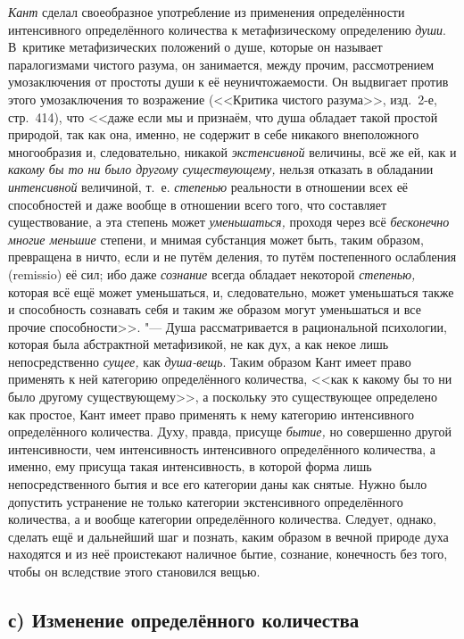 {\em Кант} сделал своеобразное употребление из применения определённости
интенсивного определённого количества к метафизическому определению {\em души}.
В~критике метафизических положений о душе, которые он называет паралогизмами
чистого разума, он занимается, между прочим, рассмотрением умозаключения от
простоты души к её неуничтожаемости. Он выдвигает против этого умозаключения то
возражение (<<Критика чистого разума>>, изд.~2-е, стр.~414), что <<даже если мы
и признаём, что душа обладает такой простой природой, так как она, именно, не
содержит в себе никакого внеположного многообразия и, следовательно, никакой
{\em экстенсивной} величины, всё же ей, как и {\em какому бы то ни было другому
существующему,} нельзя отказать в обладании {\em интенсивной} величиной, т.~е.
{\em степенью} реальности в отношении всех её способностей и даже вообще
в отношении всего того, что составляет существование, а эта степень может
{\em уменьшаться,} проходя через всё {\em бесконечно многие меньшие} степени, и
мнимая субстанция может быть, таким образом, превращена в ничто, если и не
путём деления, то путём постепенного ослабления (remissio) её сил; ибо даже
{\em сознание} всегда обладает некоторой {\em степенью,} которая всё ещё может
уменьшаться, и, следовательно, может уменьшаться также и способность сознавать
себя и таким же образом могут уменьшаться и все прочие способности>>. "--- Душа
рассматривается в рациональной психологии, которая была абстрактной
метафизикой, не как дух, а как некое лишь непосредственно {\em сущее,} как
{\em душа-вещь}. Таким образом Кант имеет право применять к ней категорию
определённого количества, <<как к какому бы то ни было другому существующему>>,
а поскольку это существующее определено как простое, Кант имеет право применять
к нему категорию интенсивного определённого количества. Духу, правда, присуще
{\em бытие,} но совершенно другой интенсивности, чем интенсивность интенсивного
определённого количества, а именно, ему присуща такая интенсивность, в которой
форма лишь непосредственного бытия и все его категории даны как снятые. Нужно
было допустить устранение не только категории экстенсивного определённого
количества, а и вообще категории определённого количества. Следует, однако,
сделать ещё и дальнейший шаг и познать, каким образом в вечной природе духа
находятся и из неё проистекают наличное бытие, сознание, конечность без того,
чтобы он вследствие этого становился вещью.

\subsection[с) Изменение определённого количества]%
{с) Изменение определённого количества}

